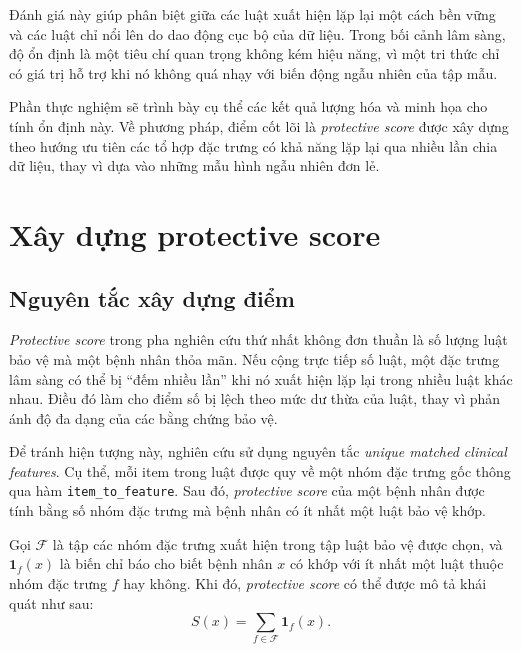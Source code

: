 \blocksep

Đánh giá này giúp phân biệt giữa các luật xuất hiện lặp lại một cách bền vững và các luật chỉ nổi lên do dao động cục bộ của dữ liệu. Trong bối cảnh lâm sàng, độ ổn định là một tiêu chí quan trọng không kém hiệu năng, vì một tri thức chỉ có giá trị hỗ trợ khi nó không quá nhạy với biến động ngẫu nhiên của tập mẫu.

\blocksep

Phần thực nghiệm sẽ trình bày cụ thể các kết quả lượng hóa và minh họa cho tính ổn định này. Về phương pháp, điểm cốt lõi là \textit{protective score} được xây dựng theo hướng ưu tiên các tổ hợp đặc trưng có khả năng lặp lại qua nhiều lần chia dữ liệu, thay vì dựa vào những mẫu hình ngẫu nhiên đơn lẻ.

\blocksep

\section{Xây dựng protective score}

\blocksep

\subsection{Nguyên tắc xây dựng điểm}

\blocksep

\textit{Protective score} trong pha nghiên cứu thứ nhất không đơn thuần là số lượng luật bảo vệ mà một bệnh nhân thỏa mãn. Nếu cộng trực tiếp số luật, một đặc trưng lâm sàng có thể bị “đếm nhiều lần” khi nó xuất hiện lặp lại trong nhiều luật khác nhau. Điều đó làm cho điểm số bị lệch theo mức dư thừa của luật, thay vì phản ánh độ đa dạng của các bằng chứng bảo vệ.

\blocksep

Để tránh hiện tượng này, nghiên cứu sử dụng nguyên tắc \textit{unique matched clinical features}. Cụ thể, mỗi item trong luật được quy về một nhóm đặc trưng gốc thông qua hàm \texttt{item\_to\_feature}. Sau đó, \textit{protective score} của một bệnh nhân được tính bằng số nhóm đặc trưng mà bệnh nhân có ít nhất một luật bảo vệ khớp.

\blocksep

Gọi $\mathcal{F}$ là tập các nhóm đặc trưng xuất hiện trong tập luật bảo vệ được chọn, và $\mathbf{1}_f(x)$ là biến chỉ báo cho biết bệnh nhân $x$ có khớp với ít nhất một luật thuộc nhóm đặc trưng $f$ hay không. Khi đó, \textit{protective score} có thể được mô tả khái quát như sau:
\[
S(x) = \sum_{f \in \mathcal{F}} \mathbf{1}_f(x).
\]


